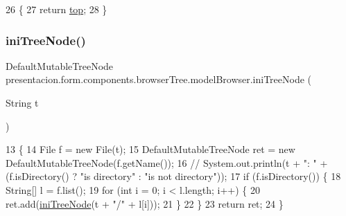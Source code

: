 \begin{DoxyCode}
26                                              \{
27         \textcolor{keywordflow}{return} \hyperlink{classpresentacion_1_1form_1_1components_1_1browserTree_1_1modelBrowser_a9fc1c6e81c509d87948fb3e47b79204b}{top};
28     \}
\end{DoxyCode}
\mbox{\label{classpresentacion_1_1form_1_1components_1_1browserTree_1_1modelBrowser_afcbfb73081526954d46d410be9821848}} 
\subsubsection{\texorpdfstring{ini\+Tree\+Node()}{iniTreeNode()}}
{\footnotesize\ttfamily Default\+Mutable\+Tree\+Node presentacion.\+form.\+components.\+browser\+Tree.\+model\+Browser.\+ini\+Tree\+Node (\begin{DoxyParamCaption}\item[{String}]{t }\end{DoxyParamCaption})\hspace{0.3cm}{\ttfamily [inline]}}


\begin{DoxyCode}
13                                                         \{
14         File f = \textcolor{keyword}{new} File(t);
15         DefaultMutableTreeNode ret = \textcolor{keyword}{new} DefaultMutableTreeNode(f.getName());
16         \textcolor{comment}{// System.out.println(t + ": " + (f.isDirectory() ? "is directory" : "is not directory"));}
17         \textcolor{keywordflow}{if} (f.isDirectory()) \{
18             String[] l = f.list();
19             \textcolor{keywordflow}{for} (\textcolor{keywordtype}{int} i = 0; i < l.length; i++) \{
20                 ret.add(\hyperlink{classpresentacion_1_1form_1_1components_1_1browserTree_1_1modelBrowser_afcbfb73081526954d46d410be9821848}{iniTreeNode}(t + \textcolor{stringliteral}{"/"} + l[i]));
21             \}
22         \}
23         \textcolor{keywordflow}{return} ret;
24     \}
\end{DoxyCode}


